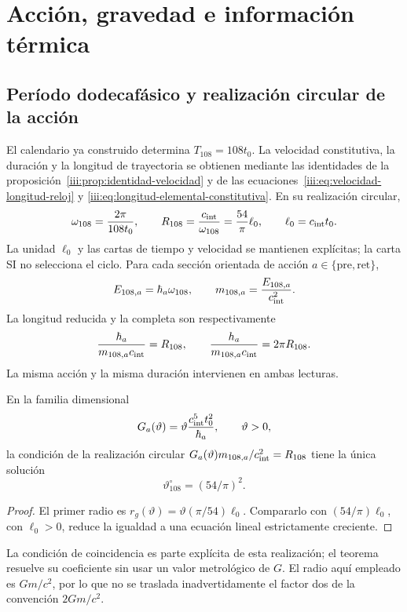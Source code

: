 \section{Acción, gravedad e información térmica}
\label{v:ant:sec:gravity}
\subsection{Período dodecafásico y realización circular de la acción}
El calendario ya construido determina $T_{108}=108t_0$.
La velocidad constitutiva, la duración y la longitud de trayectoria se
obtienen mediante las identidades de la
proposición~\ref{iii:prop:identidad-velocidad} y de las
ecuaciones~\eqref{iii:eq:velocidad-longitud-reloj} y
\eqref{iii:eq:longitud-elemental-constitutiva}.
En su realización circular,
\[
\omega_{108}=\frac{2\pi}{108t_0},\qquad
R_{108}=\frac{c_{\rm int}}{\omega_{108}}
=\frac{54}{\pi}\ell_0,\qquad \ell_0=c_{\rm int}t_0.
\]
La unidad $\ell_0$ y las cartas de tiempo y velocidad se mantienen
explícitas; la carta SI no selecciona el ciclo.
Para cada sección orientada de acción $a\in\{\mathrm{pre},\mathrm{ret}\}$,
\[
E_{108,a}=\hbar_a\omega_{108},\qquad
m_{108,a}=\frac{E_{108,a}}{c_{\rm int}^2}.
\]
La longitud reducida y la completa son respectivamente
\[
\frac{\hbar_a}{m_{108,a}c_{\rm int}}=R_{108},
\qquad
\frac{h_a}{m_{108,a}c_{\rm int}}=2\pi R_{108}.
\]
La misma acción y la misma duración intervienen en ambas lecturas.

\begin{proposition}
En la familia dimensional
\[
G_a(\vartheta)=\vartheta\frac{c_{\rm int}^5t_0^2}{\hbar_a},
\qquad \vartheta>0,
\]
la condición de la realización circular
$G_a(\vartheta)m_{108,a}/c_{\rm int}^2=R_{108}$
tiene la única solución
\[
\vartheta^\circ_{108}=(54/\pi)^2.
\]
\end{proposition}
\begin{proof}
El primer radio es
$r_g(\vartheta)=\vartheta(\pi/54)\ell_0$.
Compararlo con $(54/\pi)\ell_0$, con $\ell_0>0$, reduce la
igualdad a una ecuación lineal estrictamente creciente.
\end{proof}
La condición de coincidencia es parte explícita de esta realización;
el teorema resuelve su coeficiente sin usar un valor metrológico de $G$.
El radio aquí empleado es $Gm/c^2$, por lo que no se traslada
inadvertidamente el factor dos de la convención $2Gm/c^2$.

